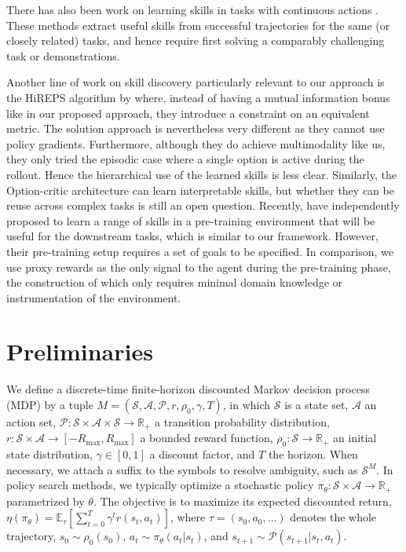 \documentclass{article} %
\newcommand{\sset}{\mathcal{S}}
\newcommand{\aset}{\mathcal{A}}
\newcommand{\trans}{\mathcal{P}}
\begin{document}
There has also been work on learning skills in tasks with continuous actions \citep{schaal2005learning, konidaris2011autonomous, daniel2013autonomous, ranchod2015nonparametric}.
These methods extract useful skills from successful trajectories for the same (or closely related) tasks, and hence require first solving a comparably challenging task or demonstrations. 


Another line of work on skill discovery particularly relevant to our approach is the HiREPS algorithm by \cite{daniel2012hierarchical} where, instead of having a mutual information bonus like in our proposed approach, they introduce a constraint on an equivalent metric. The solution approach is nevertheless very different as they cannot use policy gradients. Furthermore, although they do achieve multimodality like us, they only tried the episodic case where a single option is active during the rollout. Hence the hierarchical use of the learned skills is less clear. Similarly, the Option-critic architecture \citep{bacon2016option} can learn interpretable skills, but whether they can be reuse across complex tasks is still an open question. Recently, \cite{heess2016learning} have independently proposed to learn a range of skills in a pre-training environment that will be useful for the downstream tasks, which is similar to our framework.
However, their pre-training setup requires a set of goals to be specified.
In comparison, we use proxy rewards as the only signal to the agent during the pre-training phase, the construction of which only requires minimal domain knowledge or instrumentation of the environment.


\section{Preliminaries}
    
    We define a discrete-time finite-horizon discounted Markov decision process (MDP) by a tuple $M = (\sset, \aset, \trans, r, \rho_0, \gamma, T)$, in which $\sset$ is a state set, $\aset$ an action set, $\trans: \sset \times \aset \times \sset \rightarrow \mathbb{R}_{+}$ a transition probability distribution, $r: \sset \times \aset \rightarrow [-R_{\max}, R_{\max}]$ a bounded reward function, $\rho_0: \sset \to \mathbb{R}_+$ an initial state distribution, $\gamma \in [0, 1]$ a discount factor, and $T$ the horizon. When necessary, we attach a suffix to the symbols to resolve ambiguity, such as $\sset^M$. In policy search methods, we typically optimize a stochastic policy $\pi_{\theta}: \sset \times \aset \to \mathbb{R}_+$ parametrized by $\theta$. The objective is to maximize its expected discounted return, $ \eta(\pi_\theta) = \mathbb{E}_{\tau}[ \sum_{t=0}^T \gamma^t r(s_t, a_t) ]$, where $\tau = (s_0, a_0, \ldots)$ denotes the whole trajectory, $\displaystyle s_0 \sim \rho_0(s_0)$, $a_t \sim \pi_\theta(a_t|s_t)$, and $s_{t+1} \sim \trans(s_{t+1} | s_t, a_t)$.
\end{document}
